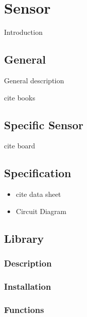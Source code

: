 %
%

\chapter{Sensor}

Introduction

\section{General}

General description

cite books

\section{Specific Sensor}

cite board

\section{Specification}

\begin{itemize}
  \item cite data sheet
  \item Circuit Diagram
\end{itemize}

\section{Library}

\subsection{Description}

\subsection{Installation}

\subsection{Functions}

